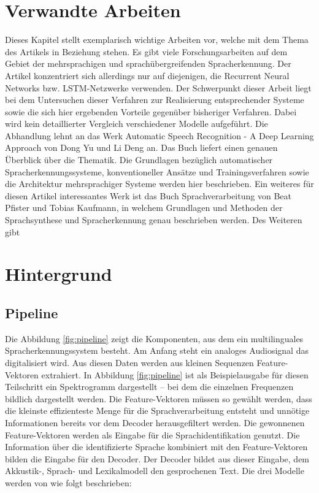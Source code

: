 \section{Verwandte Arbeiten}
Dieses Kapitel stellt exemplarisch wichtige Arbeiten vor, welche mit dem Thema des Artikels in Beziehung stehen. Es gibt viele Forschungsarbeiten auf dem Gebiet der mehrsprachigen und sprachübergreifenden Spracherkennung. Der Artikel konzentriert sich allerdings nur auf diejenigen, die Recurrent Neural Networks bzw. LSTM-Netzwerke verwenden. Der Schwerpunkt dieser Arbeit liegt bei dem Untersuchen dieser Verfahren zur Realisierung entsprechender Systeme sowie die sich hier ergebenden Vorteile gegenüber bisheriger Verfahren. Dabei wird kein detaillierter Vergleich verschiedener Modelle aufgeführt.  
Die Abhandlung lehnt an das Werk Automatic Speech Recognition - A Deep Learning Approach von Dong Yu und Li Deng \cite{Yu.2014} an. Das Buch liefert einen genauen Überblick über die Thematik. Die Grundlagen bezüglich automatischer Spracherkennungssysteme, konventioneller Ansätze und Trainingsverfahren sowie die Architektur mehrsprachiger Systeme werden hier beschrieben.
Ein weiteres für diesen Artikel interessantes Werk ist das Buch Sprachverarbeitung von Beat Pfister und Tobias Kaufmann, in welchem Grundlagen und Methoden der Sprachsynthese und Spracherkennung genau beschrieben werden.  
Des Weiteren gibt    


\section{Hintergrund}
\subsection{Pipeline}
Die Abbildung \ref{fig:pipeline} zeigt die Komponenten, aus dem ein multilinguales Spracherkennungssystem besteht.
Am Anfang steht ein analoges Audiosignal das digitalisiert wird. Aus diesen Daten werden aus kleinen Sequenzen
Feature-Vektoren extrahiert. In Abbildung \ref{fig:pipeline} ist als Beispielausgabe für diesen Teilschritt ein Spektrogramm dargestellt – bei dem die einzelnen Frequenzen bildlich dargestellt werden.
Die Feature-Vektoren müssen so gewählt werden, dass die kleinste effizienteste Menge für die Sprachverarbeitung
entsteht und unnötige Informationen bereits vor dem Decoder herausgefiltert werden.
Die gewonnenen Feature-Vektoren werden als Eingabe für die Sprachidentifikation genutzt. Die Information
über die identifizierte Sprache kombiniert mit den Feature-Vektoren bilden die Eingabe für den Decoder. Der Decoder bildet aus dieser Eingabe,
dem Akkustik-, Sprach- und Lexikalmodell den gesprochenen Text. Die drei Modelle werden von \cite{Tom.2016} wie folgt beschrieben:

